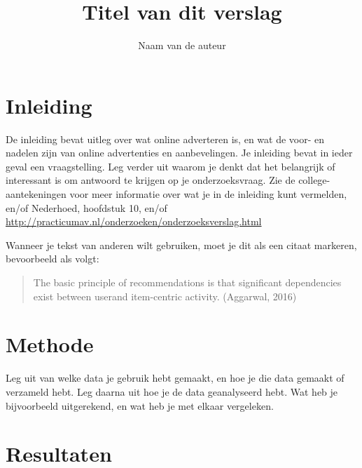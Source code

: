 \documentclass[11pt]{article}
\title{Titel van dit verslag}
\author{Naam van de auteur}
\begin{document}
\maketitle                  %
\thispagestyle{empty}       %

\section*{Inleiding}

De inleiding bevat uitleg over wat online adverteren is, en wat de voor- en nadelen zijn van online advertenties en aanbevelingen. Je inleiding bevat in ieder geval een vraagstelling. Leg verder uit waarom je denkt dat het belangrijk of interessant is om antwoord te krijgen op je onderzoeksvraag. Zie de college-aantekeningen voor meer informatie over wat je in de inleiding kunt vermelden, en/of Nederhoed, hoofdstuk 10, en/of \url{http://practicumav.nl/onderzoeken/onderzoeksverslag.html}

Wanneer je tekst van anderen wilt gebruiken, moet je dit als een citaat markeren, bevoorbeeld als volgt: 

\begin{quote}
The basic principle of recommendations is that significant dependencies exist between userand
item-centric activity. (Aggarwal, 2016)
\end{quote}


\section*{Methode}

Leg uit van welke data je gebruik hebt gemaakt, en hoe je die data gemaakt of verzameld hebt. Leg daarna uit hoe je de data geanalyseerd hebt. Wat heb je bijvoorbeeld uitgerekend, en wat heb je met elkaar vergeleken.

\section*{Resultaten }
\end{document}
